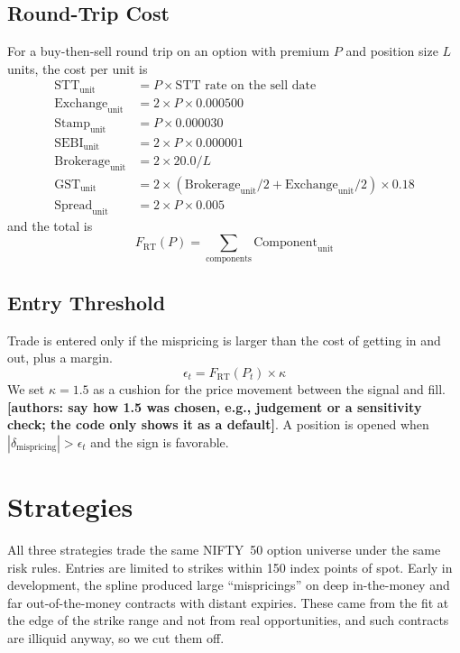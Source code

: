 \documentclass[10pt,journal,compsoc]{IEEEtran}
\newcommand{\fillin}[1]{\textbf{[#1]}}
\begin{document}
\subsection{Round-Trip Cost}
For a buy-then-sell round trip on an option with premium $P$ and position size $L$ units, the cost per unit is
\begin{align}
\text{STT}_{\text{unit}} &= P \times \text{STT rate on the sell date} \label{eq:stt} \\
\text{Exchange}_{\text{unit}} &= 2 \times P \times 0.000500 \\
\text{Stamp}_{\text{unit}} &= P \times 0.000030 \\
\text{SEBI}_{\text{unit}} &= 2 \times P \times 0.000001 \\
\text{Brokerage}_{\text{unit}} &= 2 \times 20.0 / L \\
\text{GST}_{\text{unit}} &= 2 \times (\text{Brokerage}_{\text{unit}}/2 + \text{Exchange}_{\text{unit}}/2) \times 0.18 \\
\text{Spread}_{\text{unit}} &= 2 \times P \times 0.005
\end{align}
and the total is
\begin{equation}
F_{\text{RT}}(P) = \sum_{\text{components}} \text{Component}_{\text{unit}}
\end{equation}

\subsection{Entry Threshold}
Trade is entered only if the mispricing is larger than the cost of getting in and out, plus a margin.
\begin{equation}
\epsilon_t = F_{\text{RT}}(P_t) \times \kappa
\label{eq:epsilon}
\end{equation}
We set $\kappa = 1.5$ as a cushion for the price movement between the signal and fill. \fillin{authors: say how 1.5 was chosen, e.g., judgement or a sensitivity check; the code only shows it as a default}. A position is opened when $|\delta_{\text{mispricing}}| > \epsilon_t$ and the sign is favorable.

\section{Strategies}

All three strategies trade the same NIFTY~50 option universe under the same risk rules. Entries are limited to strikes within 150 index points of spot. Early in development, the spline produced large ``mispricings'' on deep in-the-money and far out-of-the-money contracts with distant expiries. These came from the fit at the edge of the strike range and not from real opportunities, and such contracts are illiquid anyway, so we cut them off.
\end{document}
